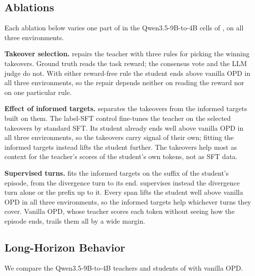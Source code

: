 \subsection{Ablations}
\label{sec:exp-repair}


Each ablation below varies one part of \method{} in the Qwen3.5-9B-to-4B cells of , on all three environments.

\textbf{Takeover selection.}\label{sec:exp-select}
 repairs the teacher with three rules for picking the winning takeovers. Ground truth reads the task reward; the consensus vote and the LLM judge do not. With either reward-free rule the student ends above vanilla OPD in all three environments, so the repair depends neither on reading the reward nor on one particular rule.



\textbf{Effect of informed targets.}
 separates the takeovers from the informed targets built on them. The label-SFT control fine-tunes the teacher on the selected takeovers by standard SFT. Its student already ends well above vanilla OPD in all three environments, so the takeovers carry signal of their own; fitting the informed targets instead lifts the student further. The takeovers help most as context for the teacher's scores of the student's own tokens, not as SFT data.


\textbf{Supervised turns.}
\method{} fits the informed targets on the suffix of the student's episode, from the divergence turn to its end.  supervises instead the divergence turn alone or the prefix up to it. Every span lifts the student well above vanilla OPD in all three environments, so the informed targets help whichever turns they cover. Vanilla OPD, whose teacher scores each token without seeing how the episode ends, trails them all by a wide margin.

\subsection{Long-Horizon Behavior}
\label{sec:exp-longhorizon}

We compare the Qwen3.5-9B-to-4B \method{} teachers and students of  with vanilla OPD.



